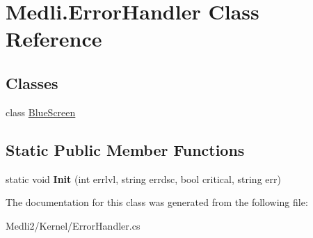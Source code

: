 \hypertarget{class_medli_1_1_error_handler}{}\section{Medli.\+Error\+Handler Class Reference}
\label{class_medli_1_1_error_handler}
\subsection*{Classes}
\begin{DoxyCompactItemize}
\item 
class \hyperlink{class_medli_1_1_error_handler_1_1_blue_screen}{Blue\+Screen}
\end{DoxyCompactItemize}
\subsection*{Static Public Member Functions}
\begin{DoxyCompactItemize}
\item 
\mbox{\label{class_medli_1_1_error_handler_a51c4b99a6b5e7b0a54da94af2aa9478f}} 
static void {\bfseries Init} (int errlvl, string errdsc, bool critical, string err)
\end{DoxyCompactItemize}


The documentation for this class was generated from the following file\+:\begin{DoxyCompactItemize}
\item 
Medli2/\+Kernel/Error\+Handler.\+cs\end{DoxyCompactItemize}
